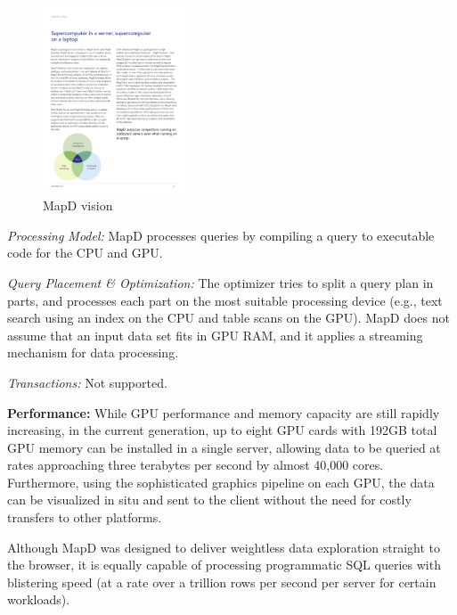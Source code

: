 \documentclass[twocolumn]{article}
\begin{document}
\begin{figure}[htb]
        \centering
        \includegraphics[width=0.38\textwidth]{mapd-diagram.pdf}
        \caption{MapD vision}
        \label{fig:mapd-diagram}
\end{figure}

\noindent
\textit{Processing Model:} 
MapD processes queries by compiling a query to executable code for the CPU and GPU.

\noindent
\textit{Query Placement \& Optimization:} 
The optimizer tries to split a query plan in parts, and processes each part on the most suitable processing device (e.g., text search using an index on the CPU and table scans on the GPU). MapD does not assume that an input data set fits in GPU RAM, and it applies a streaming mechanism for data processing.

\noindent
\textit{Transactions:} Not supported.

\noindent
\textbf{Performance:} While GPU performance and memory capacity are still rapidly increasing, in the current generation, up to eight GPU cards with 192GB total GPU memory can be installed in a single server, allowing data to be queried at rates approaching three terabytes per second by almost 40,000 cores. Furthermore, using the sophisticated graphics pipeline on each GPU, the data can be visualized in situ and sent to the client without the need for costly transfers to other platforms.

Although MapD was designed to deliver weightless data exploration straight to the browser, it is equally capable of processing programmatic SQL queries with blistering speed (at a rate over a trillion rows per second per server for certain workloads).
\end{document}
